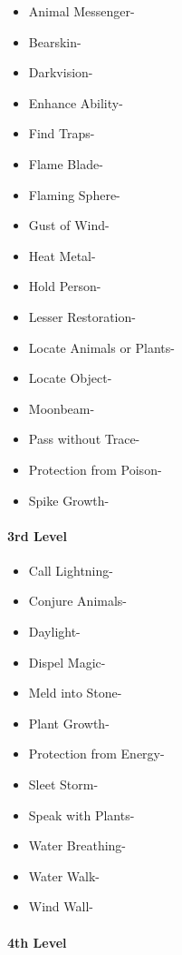 \documentclass[
]{article}
\providecommand{\tightlist}{%
  \setlength{\itemsep}{0pt}\setlength{\parskip}{0pt}}
\begin{document}
\begin{itemize}
\tightlist
\item
  Animal Messenger-
\item
  Bearskin-
\item
  Darkvision-
\item
  Enhance Ability-
\item
  Find Traps-
\item
  Flame Blade-
\item
  Flaming Sphere-
\item
  Gust of Wind-
\item
  Heat Metal-
\item
  Hold Person-
\item
  Lesser Restoration-
\item
  Locate Animals or Plants-
\item
  Locate Object-
\item
  Moonbeam-
\item
  Pass without Trace-
\item
  Protection from Poison-
\item
  Spike Growth-
\end{itemize}

\hypertarget{3rd-level-2}{%
\paragraph{3rd Level}\label{3rd-level-2}}

\begin{itemize}
\tightlist
\item
  Call Lightning-
\item
  Conjure Animals-
\item
  Daylight-
\item
  Dispel Magic-
\item
  Meld into Stone-
\item
  Plant Growth-
\item
  Protection from Energy-
\item
  Sleet Storm-
\item
  Speak with Plants-
\item
  Water Breathing-
\item
  Water Walk-
\item
  Wind Wall-
\end{itemize}

\hypertarget{4th-level-2}{%
\paragraph{4th Level}\label{4th-level-2}}
\end{document}
